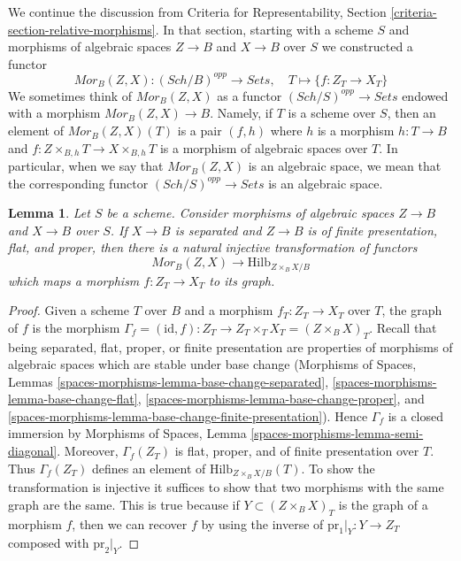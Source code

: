 \documentclass{stacks-project}
\theoremstyle{plain}
\newtheorem{lemma}[subsection]{Lemma}
\theoremstyle{definition}
\theoremstyle{remark}
\numberwithin{equation}{subsection}
\def\Sch{\mathit{Sch}}
\def\Hilbfunctor{\mathrm{Hilb}}
\begin{document}
\noindent
We continue the discussion from Criteria for Representability, Section
\ref{criteria-section-relative-morphisms}.
In that section, starting with a scheme $S$ and morphisms
of algebraic spaces $Z \to B$ and $X \to B$ over $S$
we constructed a functor
$$
\mathit{Mor}_B(Z, X) : (\Sch/B)^{opp} \longrightarrow \textit{Sets}, \quad
T \longmapsto \{f : Z_T \to X_T\}
$$
We sometimes think of $\mathit{Mor}_B(Z, X)$
as a functor $(\Sch/S)^{opp} \to \textit{Sets}$ endowed with a morphism
$\mathit{Mor}_B(Z, X) \to B$.
Namely, if $T$ is a scheme over $S$, then an element
of $\mathit{Mor}_B(Z, X)(T)$ is a pair $(f, h)$
where $h$ is a morphism $h : T \to B$
and $f : Z \times_{B, h} T \to X \times_{B, h} T$
is a morphism of algebraic spaces over $T$. In particular, when we say
that $\mathit{Mor}_B(Z, X)$ is an algebraic space, we mean that the
corresponding functor $(\Sch/S)^{opp} \to \textit{Sets}$ is an algebraic space.

\begin{lemma}
\label{lemma-Mor-into-Hilb}
Let $S$ be a scheme. Consider morphisms
of algebraic spaces $Z \to B$ and $X \to B$ over $S$.
If $X \to B$ is separated and $Z \to B$ is
of finite presentation, flat, and proper,
then there is a natural
injective transformation of functors
$$
\mathit{Mor}_B(Z, X) \longrightarrow \Hilbfunctor_{Z \times_B X/B}
$$
which maps a morphism $f : Z_T \to X_T$ to its graph.
\end{lemma}

\begin{proof}
Given a scheme $T$ over $B$ and a morphism $f_T : Z_T \to X_T$
over $T$, the graph of $f$ is the morphism
$\Gamma_f = (\text{id}, f) : Z_T \to Z_T \times_T X_T = (Z \times_B X)_T$.
Recall that being separated, flat, proper, or finite presentation
are properties of morphisms of algebraic spaces which are stable
under base change (Morphisms of Spaces, Lemmas
\ref{spaces-morphisms-lemma-base-change-separated},
\ref{spaces-morphisms-lemma-base-change-flat},
\ref{spaces-morphisms-lemma-base-change-proper}, and
\ref{spaces-morphisms-lemma-base-change-finite-presentation}).
Hence $\Gamma_f$ is a closed immersion by
Morphisms of Spaces, Lemma \ref{spaces-morphisms-lemma-semi-diagonal}.
Moreover, $\Gamma_f(Z_T)$ is flat, proper, and of finite presentation over $T$.
Thus $\Gamma_f(Z_T)$ defines an element of $\Hilbfunctor_{Z \times_B X/B}(T)$.
To show the transformation is injective it suffices to show that
two morphisms with the same graph are the same. This is true because
if $Y \subset (Z \times_B X)_T$ is the graph of a morphism $f$, then
we can recover $f$ by using the inverse of $\text{pr}_1|_Y : Y \to Z_T$
composed with $\text{pr}_2|_Y$.
\end{proof}
\end{document}
